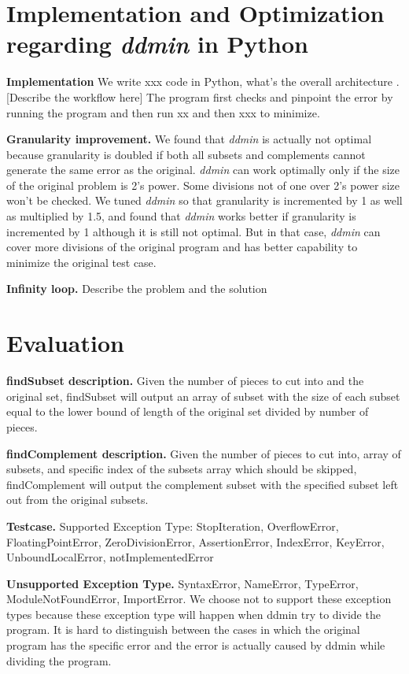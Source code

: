 \documentclass[12pt]{article}
\def\name{\textit{ddmin}\xspace}
\begin{document}
\section{Implementation and Optimization regarding \name in Python}
\textbf{Implementation} We write xxx code in Python, what's the overall architecture . [Describe the workflow here] The program first checks and pinpoint the error by running the program and then run xx and then xxx to minimize.


\textbf{Granularity improvement.} We found that \name is actually not optimal because granularity is doubled if both all subsets and complements cannot generate the same error as the original. \name can work optimally only if the size of the original problem is  2’s power. Some divisions not of one over 2’s power size won’t be checked. We tuned \name so that granularity is incremented by 1 as well as multiplied by 1.5, and found that \name works better if granularity is incremented by 1 although it is still not optimal. But in that case, \name can cover more divisions of the original program and has better capability to minimize the original test case. 

\textbf{Infinity loop.} Describe the problem and the solution


\section{Evaluation}
\textbf{findSubset description.}
Given the number of pieces to cut into and the original set, findSubset will output an array of subset with the size of each subset equal to the lower bound of length of the original set divided by number of pieces. 

\noindent
\textbf{findComplement description.}
Given the number of pieces to cut into, array of subsets, and specific index of the subsets array which should be skipped, findComplement will output the complement subset with the specified subset left out from the original subsets.

\noindent
\textbf{Testcase.}
Supported Exception Type:
StopIteration, OverflowError, FloatingPointError, ZeroDivisionError, AssertionError, IndexError, KeyError, UnboundLocalError, notImplementedError

\noindent
\textbf{Unsupported Exception Type.}
SyntaxError, NameError, TypeError, ModuleNotFoundError, ImportError. We choose not to support these exception types because these exception type will happen when ddmin try to divide the program. It is hard to distinguish between the cases in which the original program has the specific error and the error is actually caused by ddmin while dividing the program. 
\end{document}
